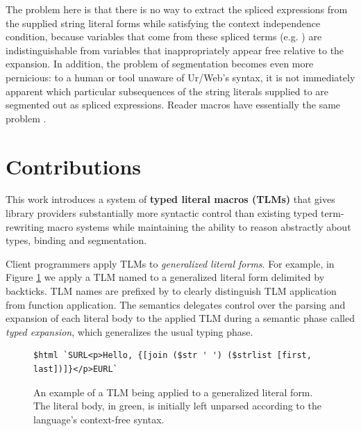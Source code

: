 The problem here is that there is no way to extract the spliced expressions from the supplied string literal forms while satisfying the context independence condition, because variables that come from these spliced terms (e.g. ) are indistinguishable from variables that inappropriately appear free relative to the expansion. In addition, the problem of segmentation becomes even more pernicious: to a human or tool unaware of Ur/Web's syntax, it is not immediately apparent which particular subsequences of the string literals supplied to  are segmented out as spliced expressions. Reader macros have essentially the same problem  \cite{DBLP:journals/jfp/FlattCDF12}.

\section{Contributions}\label{sec:contributions}

This work introduces a system of \textbf{typed literal macros (TLMs)} that gives library providers substantially more syntactic control than existing typed term-rewriting macro systems while maintaining the ability to reason abstractly about types, binding and segmentation.%

Client programmers apply TLMs to \emph{generalized literal forms}. For example, in Figure \ref{fig:first-tsm-example} we apply a TLM named  to a generalized literal form delimited by backticks. TLM names are prefixed by \li{#\dolla#} to clearly distinguish TLM application from function application. The semantics delegates control over the parsing and expansion of each literal body to the applied TLM during a semantic phase called \emph{typed expansion}, which generalizes the usual typing phase. 
\begin{figure}[ht!]
\begin{lstlisting}[numbers=none,xleftmargin=0px]
$html `SURL<p>Hello, {[join ($str ' ') ($strlist [first, last])]}</p>EURL`
\end{lstlisting}
\caption[An example of a TLM being applied to a generalized literal form]{An example of a TLM being applied to a generalized literal form. The literal body, in green, is initially left unparsed according to the language's context-free syntax.}
\label{fig:first-tsm-example}
\end{figure}

